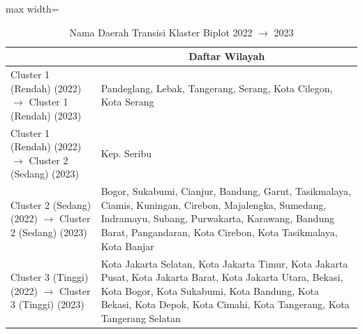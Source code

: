 \begin{table}[H]
\centering
\caption{Nama Daerah Transisi Klaster Biplot 2022 \(\rightarrow\) 2023} \label{tab:app1biplot_trans_name_2022x2023}
\begin{adjustbox}{max width=\textwidth}
\begin{tabular}{|>{\centering\arraybackslash}p{4cm}|p{10cm}|}
\hline
\multicolumn{1}{|c|}{\textbf{Kategori}} & \multicolumn{1}{c|}{\textbf{Daftar Wilayah}} \\
\hline
Cluster 1 (Rendah) (2022) \(\rightarrow\) Cluster 1 (Rendah) (2023) & Pandeglang, Lebak, Tangerang, Serang, Kota Cilegon, Kota Serang \\
\hline
Cluster 1 (Rendah) (2022) \(\rightarrow\) Cluster 2 (Sedang) (2023) & Kep. Seribu \\
\hline
Cluster 2 (Sedang) (2022) \(\rightarrow\) Cluster 2 (Sedang) (2023) & Bogor, Sukabumi, Cianjur, Bandung, Garut, Tasikmalaya, Ciamis, Kuningan, Cirebon, Majalengka, Sumedang, Indramayu, Subang, Purwakarta, Karawang, Bandung Barat, Pangandaran, Kota Cirebon, Kota Tasikmalaya, Kota Banjar \\
\hline
Cluster 3 (Tinggi) (2022) \(\rightarrow\) Cluster 3 (Tinggi) (2023) & Kota Jakarta Selatan, Kota Jakarta Timur, Kota Jakarta Pusat, Kota Jakarta Barat, Kota Jakarta Utara, Bekasi, Kota Bogor, Kota Sukabumi, Kota Bandung, Kota Bekasi, Kota Depok, Kota Cimahi, Kota Tangerang, Kota Tangerang Selatan \\
\hline
\end{tabular}
\end{adjustbox}
\end{table}